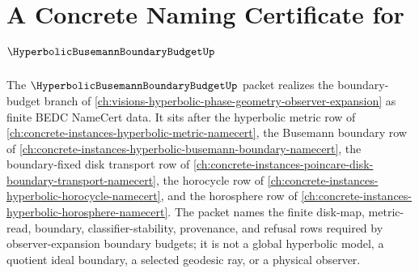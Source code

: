 \chapter{A Concrete Naming Certificate for $\HyperbolicBusemannBoundaryBudgetUp$}
\label{ch:concrete-instances-hyperbolic-busemann-boundary-budget-namecert}

The $\HyperbolicBusemannBoundaryBudgetUp$ packet realizes the boundary-budget branch of \autoref{ch:visions-hyperbolic-phase-geometry-observer-expansion} as finite BEDC NameCert data. It sits after the hyperbolic metric row of \autoref{ch:concrete-instances-hyperbolic-metric-namecert}, the Busemann boundary row of \autoref{ch:concrete-instances-hyperbolic-busemann-boundary-namecert}, the boundary-fixed disk transport row of \autoref{ch:concrete-instances-poincare-disk-boundary-transport-namecert}, the horocycle row of \autoref{ch:concrete-instances-hyperbolic-horocycle-namecert}, and the horosphere row of \autoref{ch:concrete-instances-hyperbolic-horosphere-namecert}. The packet names the finite disk-map, metric-read, boundary, classifier-stability, provenance, and refusal rows required by observer-expansion boundary budgets; it is not a global hyperbolic model, a quotient ideal boundary, a selected geodesic ray, or a physical observer.

